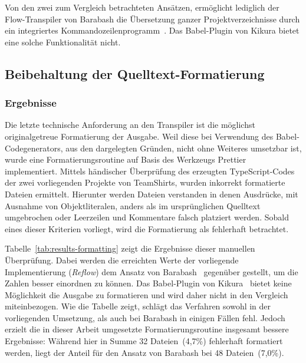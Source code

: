 Von den zwei zum Vergleich betrachteten Ansätzen, ermöglicht lediglich der Flow-Transpiler von Barabash die Übersetzung ganzer Projektverzeichnisse durch ein integriertes Kommandozeilenprogramm~\autocite{BARABASH:FLOW_TO_TS}. Das Babel-Plugin von Kikura bietet eine solche Funktionalität nicht.

\subsection{Beibehaltung der Quelltext-Formatierung}

\subsubsection{Ergebnisse}

Die letzte technische Anforderung an den Transpiler ist die möglichst originalgetreue Formatierung der Ausgabe. Weil diese bei Verwendung des Babel-Codegenerators, aus den dargelegten Gründen, nicht ohne Weiteres umsetzbar ist, wurde eine Formatierungsroutine auf Basis des Werkzeugs Prettier~\autocite{SOFTWARE:PRETTIER} implementiert. Mittels händischer Überprüfung des erzeugten TypeScript-Codes der zwei vorliegenden Projekte von TeamShirts, wurden inkorrekt formatierte Dateien ermittelt. Hierunter werden Dateien verstanden in denen Ausdrücke, mit Ausnahme von Objektliteralen, anders als im ursprünglichen Quelltext umgebrochen oder Leerzeilen und Kommentare falsch platziert werden. Sobald eines dieser Kriterien vorliegt, wird die Formatierung als fehlerhaft betrachtet.

Tabelle~\ref{tab:results-formatting} zeigt die Ergebnisse dieser manuellen Überprüfung. Dabei werden die erreichten Werte der vorliegende Implementierung (\textit{Reflow}) dem Ansatz von Barabash~\autocite{BARABASH:FLOW_TO_TS} gegenüber gestellt, um die Zahlen besser einordnen zu können. Das Babel-Plugin von Kikura~\autocite{KIKURA:FLOW_TO_TS} bietet keine Möglichkeit die Ausgabe zu formatieren und wird daher nicht in den Vergleich miteinbezogen.
Wie die Tabelle zeigt, schlägt das Verfahren sowohl in der vorliegenden Umsetzung, als auch bei Barabash in einigen Fällen fehl. Jedoch erzielt die in dieser Arbeit umgesetzte Formatierungsroutine insgesamt bessere Ergebnisse: Während hier in Summe 32 Dateien~(4,7\%) fehlerhaft formatiert werden, liegt der Anteil für den Ansatz von Barabash bei 48 Dateien~(7,0\%).

\medbreak



